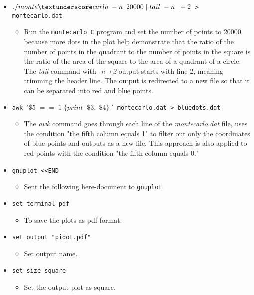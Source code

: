 \documentclass[12pt]{article}
\begin{document}
\begin{itemize}
   \item \texttt{$./monte\textunderscore carlo\; -n\;\; 20000\; |\; tail\; -n\;\; +2$ > monte\textunderscore carlo.dat}
   \begin{itemize}
     \item Run the \texttt{monte\textunderscore carlo C} program and set the number of points to 20000 because more dots in the plot help demonstrate that the ratio of the number of points in the quadrant to the number of points in the square is the ratio of the area of the square to the area of a quadrant of a circle. The \textit{tail} command with \textit{-n +2} output starts with line 2, meaning trimming the header line. The output is redirected to a new file so that it can be separated into red and blue points.
   \end{itemize}
   \item \texttt{awk $'\$5\; ==\; 1\; \{print\;\; \$3,\; \$4\}\; '$ monte\textunderscore carlo.dat > blue\textunderscore dots.dat}
   \begin{itemize}
     \item The \textit{awk} command goes through each line of the \textit{monte\textunderscore carlo.dat} file, uses the condition "the fifth column equals 1" to filter out only the coordinates of blue points and outputs as a new file. This approach is also applied to red points with the condition "the fifth column equals 0."
   \end{itemize}
   \item \texttt{gnuplot <\!<END}
   \begin{itemize}
     \item Sent the following here-document to \texttt{gnuplot}.
   \end{itemize}
   \item \texttt{set terminal pdf}
   \begin{itemize}
     \item To save the plots as pdf format.
   \end{itemize}
   \item \texttt{set output "pi\textunderscore dot.pdf"}
   \begin{itemize}
     \item Set output name.
   \end{itemize}
   \item \texttt{set size square}
   \begin{itemize}
     \item Set the output plot as square.

\end{itemize}
\end{itemize}
\end{document}
